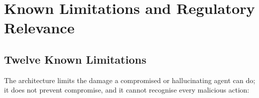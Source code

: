 \documentclass[11pt, a4paper]{article}
\begin{document}
\section{Known Limitations and Regulatory Relevance}
\label{sec:limitations}

\subsection{Twelve Known Limitations}
\label{subsec:known-limitations}

The architecture limits the damage a compromised or hallucinating agent can do; it does not prevent compromise, and it cannot recognise every malicious action:
\end{document}
